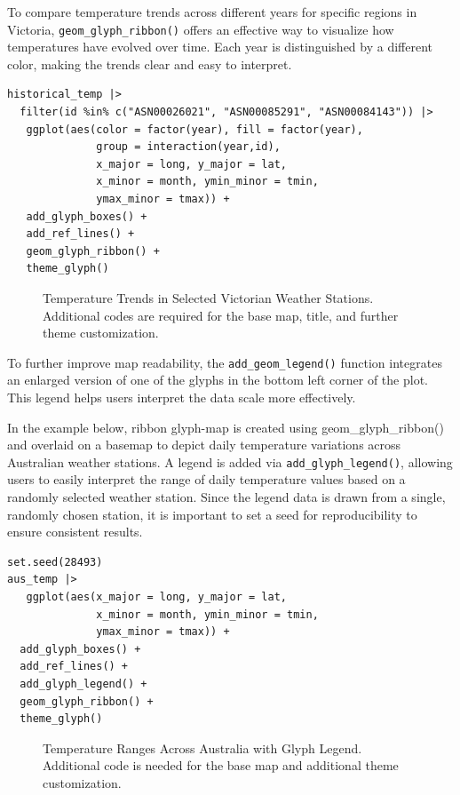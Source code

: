 To compare temperature trends across different years for specific regions in Victoria, \texttt{geom\_glyph\_ribbon()} offers an effective way to visualize how temperatures have evolved over time. Each year is distinguished by a different color, making the trends clear and easy to interpret.

\begin{verbatim}
historical_temp |> 
  filter(id %in% c("ASN00026021", "ASN00085291", "ASN00084143")) |>
   ggplot(aes(color = factor(year), fill = factor(year),
              group = interaction(year,id),
              x_major = long, y_major = lat,
              x_minor = month, ymin_minor = tmin, 
              ymax_minor = tmax)) +
   add_glyph_boxes() +
   add_ref_lines() +
   geom_glyph_ribbon() +
   theme_glyph()
\end{verbatim}

\begin{figure}
\centering
{}
\caption{\label{fig:unnamed-chunk-13}Temperature Trends in Selected Victorian Weather Stations. Additional codes are required for the base map, title, and further theme customization.}
\end{figure}

To further improve map readability, the \texttt{add\_geom\_legend()} function integrates an enlarged version of one of the glyphs in the bottom left corner of the plot. This legend helps users interpret the data scale more effectively.

In the example below, ribbon glyph-map is created using geom\_glyph\_ribbon() and overlaid on a basemap to depict daily temperature variations across Australian weather stations. A legend is added via \texttt{add\_glyph\_legend()}, allowing users to easily interpret the range of daily temperature values based on a randomly selected weather station. Since the legend data is drawn from a single, randomly chosen station, it is important to set a seed for reproducibility to ensure consistent results.

\begin{verbatim}
set.seed(28493)
aus_temp |>
   ggplot(aes(x_major = long, y_major = lat,
              x_minor = month, ymin_minor = tmin,
              ymax_minor = tmax)) +
  add_glyph_boxes() +
  add_ref_lines() +
  add_glyph_legend() +
  geom_glyph_ribbon() +
  theme_glyph() 
\end{verbatim}

\begin{figure}
\centering
{}
\caption{\label{fig:unnamed-chunk-15}Temperature Ranges Across Australia with Glyph Legend. Additional code is needed for the base map and additional theme customization.}
\end{figure}

